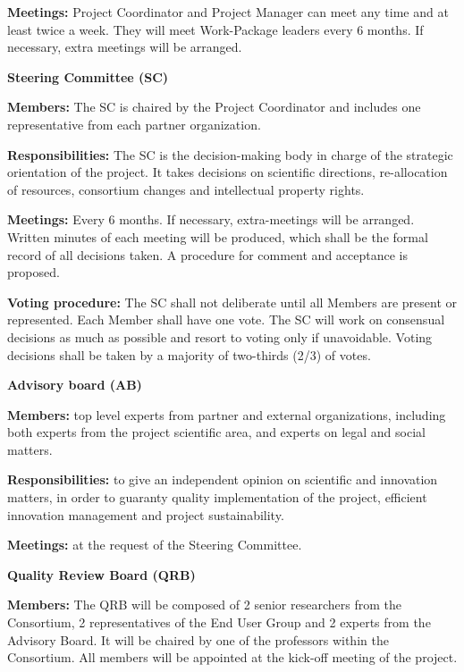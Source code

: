 \textbf{Meetings:} Project Coordinator and
  Project Manager can meet any time and at least twice a week. They
  will meet Work-Package leaders every 6 months. If necessary,
  extra meetings will be arranged.


\smallbreak\noindent\textbf{Steering Committee (SC)}\nobreak\par

\textbf{Members:} The SC is chaired by the Project Coordinator
and includes one representative from each partner organization.

\textbf{Responsibilities:} The SC is the decision-making body in
charge of the strategic orientation of the project.  It takes decisions on scientific
directions, re-allocation of resources, consortium
changes and intellectual property rights.

\textbf{Meetings:} Every 6 months. If necessary, extra-meetings
will be arranged.  Written minutes of each meeting will be produced,
which shall be the formal record of all decisions taken. A procedure
for comment and acceptance is proposed.

\textbf{Voting procedure:} The SC shall not deliberate until all
Members are present or represented.  Each Member shall have one
vote. The SC will work on consensual decisions as much as possible and
resort to voting only if unavoidable. Voting decisions shall be taken
by a majority of two-thirds (2/3) of votes.

\smallbreak\noindent\textbf{Advisory board (AB)}\nobreak\par

\textbf{Members:} top level experts from partner and external
organizations, including both experts from the project scientific area,
and experts on legal and social matters.

\textbf{Responsibilities:} to give an independent opinion on
scientific and innovation matters, in order to guaranty quality
implementation of the project, efficient innovation management and
project sustainability.  

\textbf{Meetings:} at the request of the Steering Committee.

\smallbreak\noindent\textbf{Quality Review Board (QRB)}\nobreak\par
\textbf{Members:} The QRB will be composed of 2 senior
researchers from the Consortium, 2 representatives of the End User
Group and 2 experts from the Advisory Board. It will be chaired by one
of the professors within the Consortium. All members will be appointed
at the kick-off meeting of the project.  

